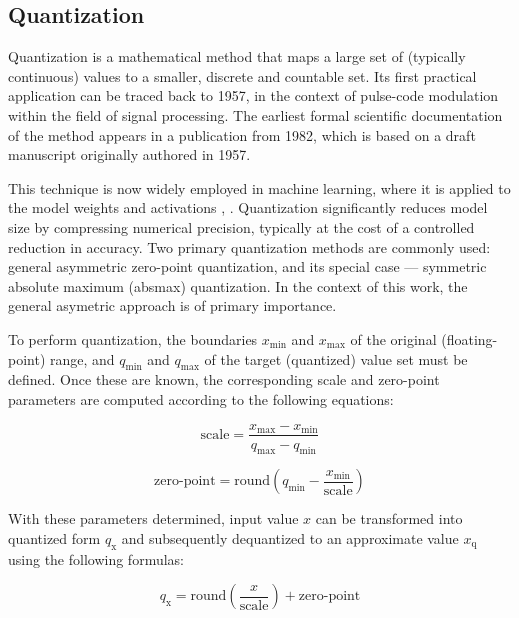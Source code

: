 {\subsection{Quantization}

Quantization is a mathematical method that maps a large set of (typically continuous) values to a smaller, discrete and countable set. Its first practical application can be traced back to 1957, in the context of pulse-code modulation within the field of signal processing. The earliest formal scientific documentation of the method appears in a publication from 1982, which is based on a draft manuscript originally authored in 1957. \cite{firstQuantization}

This technique is now widely employed in machine learning, where it is applied to the model weights and activations \cite{MLQuantization1}, \cite{MLQuantization2}. Quantization significantly reduces model size by compressing numerical precision, typically at the cost of a controlled reduction in accuracy.  Two primary quantization methods are commonly used: general asymmetric zero-point quantization, and its special case --- symmetric absolute maximum (absmax) quantization. In the context of this work, the general asymetric approach is of primary importance.

To perform quantization, the boundaries \( x_{\text{min}} \) and \( x_{\text{max}} \) of the original (floating-point) range, and \( q_{\text{min}} \) and \( q_{\text{max}} \) of the target (quantized) value set must be defined. Once these are known, the corresponding scale and zero-point parameters are computed according to the following equations:

\begin{equation}
\text{scale} = \frac{x_{\text{max}} - x_{\text{min}}}{q_{\text{max}} - q_{\text{min}}}
\label{eq:scale}
\end{equation}

\begin{equation}
\text{zero-point} = \text{round}\left( q_{\text{min}} - \frac{x_{\text{min}}}{\text{scale}} \right)
\label{eq:zeropoint}
\end{equation}

With these parameters determined, input value \( x \) can be transformed into quantized form \( q_{\text{x}} \) and subsequently dequantized to an approximate value \( x_{\text{q}} \) using the following formulas:

\begin{equation}
q_{\text{x}} = \text{round}\left(\frac{x}{\text{scale}} \right) + \text{zero-point}
\label{eq:quantize}
\end{equation}

}
